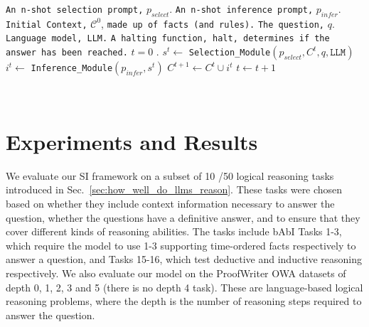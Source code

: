 \begin{small}\begin{algorithm}
\caption{Selection-Inference}\label{alg:selection_inference}
\begin{algorithmic}
\Require \texttt{An n-shot selection prompt,} $p_{select}$.
\Require \texttt{An n-shot inference prompt,} $p_{infer}$.
\Require \texttt{Initial Context,} $\mathcal{C}^0$, \texttt{made up of facts (and rules).}
\Require \texttt{The question,} $q$.
\Require \texttt{Language model, LLM.}
\Require \texttt{A halting function, halt, determines if the answer has been reached.}
\State $t=0$ .
    \State $s^t \gets$ \texttt{Selection\_Module}$(p_{select}, C^t, q, \texttt{LLM})$ 
    \State $i^t \gets$ \texttt{Inference\_Module}$(p_{infer}, s^t)$ 
    \State $C^{t+1} \gets C^t \cup i^t$ 
    \State $t \gets t+1$ 

\EndWhile \\
\end{algorithmic}
\end{algorithm}
\end{small}

\section{Experiments and Results}
\label{sec:experiments_results}
We evaluate our SI framework on a subset of 10 /50  logical reasoning tasks introduced in Sec.~\ref{sec:how_well_do_llms_reason}. These tasks were chosen based on whether they include context information necessary to answer the question, whether the questions have a definitive answer, and to ensure that they cover different kinds of reasoning abilities. The tasks include bAbI \citep{weston2015towards} Tasks 1-3, which require the model to use 1-3 supporting time-ordered facts respectively to answer a question, and Tasks 15-16, which test deductive and inductive reasoning respectively. We also evaluate our model on the ProofWriter OWA datasets \citep{tafjord2020proofwriter} of depth 0, 1, 2, 3 and 5 (there is no depth 4 task). These are language-based logical reasoning problems, where the depth is the number of reasoning steps required to answer the question.

